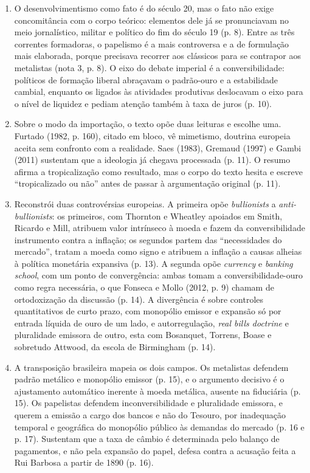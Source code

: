 \begin{enumerate}[leftmargin=*,nosep]
\item O desenvolvimentismo como fato é do século 20, mas o fato não exige
concomitância com o corpo teórico: elementos dele já se pronunciavam no meio
jornalístico, militar e político do fim do século 19 (p. 8). Entre as três
correntes formadoras, o papelismo é a mais controversa e a de formulação mais
elaborada, porque precisava recorrer aos clássicos para se contrapor aos
metalistas (nota 3, p. 8). O eixo do debate imperial é a conversibilidade:
políticos de formação liberal abraçavam o padrão-ouro e a estabilidade cambial,
enquanto os ligados às atividades produtivas deslocavam o eixo para o nível de
liquidez e pediam atenção também à taxa de juros (p. 10).

\item Sobre o modo da importação, o texto opõe duas leituras e escolhe uma.
Furtado (1982, p. 160), citado em bloco, vê mimetismo, doutrina europeia aceita
sem confronto com a realidade. Saes (1983), Gremaud (1997) e Gambi (2011)
sustentam que a ideologia já chegava processada (p. 11). O resumo afirma a
tropicalização como resultado, mas o corpo do texto hesita e escreve
``tropicalizado ou não'' antes de passar à argumentação original (p. 11).

\item Reconstrói duas controvérsias europeias. A primeira opõe
\emph{bullionists} a \emph{anti-bullionists}: os primeiros, com Thornton e
Wheatley apoiados em Smith, Ricardo e Mill, atribuem valor intrínseco à moeda e
fazem da conversibilidade instrumento contra a inflação; os segundos partem das
``necessidades do mercado'', tratam a moeda como signo e atribuem a inflação a
causas alheias à política monetária expansiva (p. 13). A segunda opõe
\emph{currency} e \emph{banking school}, com um ponto de convergência: ambas
tomam a conversibilidade-ouro como regra necessária, o que Fonseca e Mollo
(2012, p. 9) chamam de ortodoxização da discussão (p. 14). A divergência é
sobre controles quantitativos de curto prazo, com monopólio emissor e expansão
só por entrada líquida de ouro de um lado, e autorregulação, \emph{real bills
doctrine} e pluralidade emissora de outro, esta com Bosanquet, Torrens, Boase e
sobretudo Attwood, da escola de Birmingham (p. 14).

\item A transposição brasileira mapeia os dois campos. Os metalistas defendem
padrão metálico e monopólio emissor (p. 15), e o argumento decisivo é o
ajustamento automático inerente à moeda metálica, ausente na fiduciária (p.
15). Os papelistas defendem inconversibilidade e pluralidade emissora, e querem
a emissão a cargo dos bancos e não do Tesouro, por inadequação temporal e
geográfica do monopólio público às demandas do mercado (p. 16 e p. 17).
Sustentam que a taxa de câmbio é determinada pelo balanço de pagamentos, e não
pela expansão do papel, defesa contra a acusação feita a Rui Barbosa a partir
de 1890 (p. 16).


\end{enumerate}
